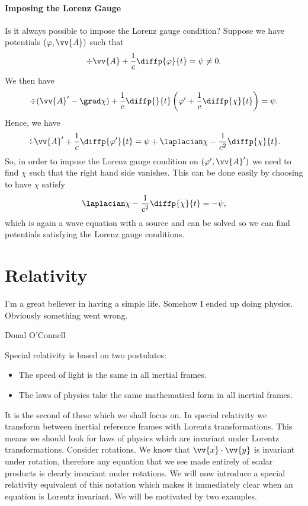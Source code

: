 \subsubsection{Imposing the Lorenz Gauge}
Is it always possible to impose the Lorenz gauge condition?
Suppose we have potentials \((\varphi, \vv{A})\) such that
\begin{equation}
    \div\vv{A} + \frac{1}{c}\diffp{\varphi}{t} = \psi \ne 0.
\end{equation}
We then have
\begin{equation}
    \div(\vv{A}' - \grad\chi) + \frac{1}{c}\diffp{}{t}\left( \varphi' + \frac{1}{c}\diffp{\chi}{t} \right) = \psi.
\end{equation}
Hence, we have
\begin{equation}
    \div\vv{A}' + \frac{1}{c}\diffp{\varphi'}{t} = \psi + \laplacian\chi - \frac{1}{c^2}\diffp{\chi}{t}.
\end{equation}
So, in order to impose the Lorenz gauge condition on \((\varphi', \vv{A}')\) we need to find \(\chi\) such that the right hand side vanishes.
This can be done easily by choosing to have \(\chi\) satisfy
\begin{equation}
    \laplacian\chi - \frac{1}{c^2}\diffp{\chi}{t} = -\psi,
\end{equation}
which is again a wave equation with a source and can be solved so we can find potentials satisfying the Lorenz gauge conditions.


\chapter{Relativity}
\epigraph{I'm a great believer in having a simple life. Somehow I ended up doing physics. Obviously something went wrong.}{Donal O'Connell}
Special relativity is based on two postulates:
\begin{itemize}
    \item The speed of light is the same in all inertial frames.
    \item The laws of physics take the same mathematical form in all inertial frames.
\end{itemize}
It is the second of these which we shall focus on.
In special relativity we transform between inertial reference frames with Lorentz transformations.
This means we should look for laws of physics which are invariant under Lorentz transformations.
Consider rotations.
We know that \(\vv{x} \cdot \vv{y}\) is invariant under rotation, therefore any equation that we see made entirely of scalar products is clearly invariant under rotations.
We will now introduce a special relativity equivalent of this notation which makes it immediately clear when an equation is Lorentz invariant.
We will be motivated by two examples.

